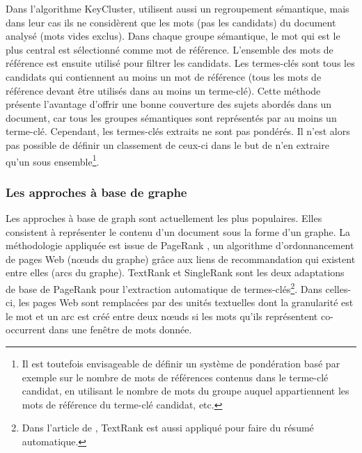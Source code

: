         Dans l'algorithme KeyCluster,   utilisent
        aussi un regroupement sémantique, mais dans leur cas ils ne
        considèrent que les mots (pas les candidats) du document analysé (mots
        vides exclus). Dans chaque groupe sémantique, le mot qui est le plus
        central est sélectionné comme mot de référence. L'ensemble des mots de
        référence est ensuite utilisé pour filtrer les candidats. Les
        termes-clés sont tous les candidats qui contiennent au moins un mot de
        référence (tous les mots de référence devant être utilisés dans au
        moins un terme-clé). Cette méthode présente l'avantage d'offrir une
        bonne couverture des sujets abordés dans un document, car tous les
        groupes sémantiques sont représentés par au moins un terme-clé.
        Cependant, les termes-clés extraits ne sont pas pondérés. Il n'est
        alors pas possible de définir un classement de ceux-ci dans le but de
        n'en extraire qu'un sous ensemble\footnote{Il est toutefois
        envisageable de définir un système de pondération basé par exemple sur
        le nombre de mots de références contenus dans le terme-clé candidat,
        en  utilisant le nombre de mots du groupe auquel appartiennent les
        mots de référence du terme-clé candidat, etc.}.

      \subsubsection{Les approches à base de graphe}
      \label{subsubsec:main-state_of_the_art-automatic_keyphrase_extraction-unsupervised_keyphrase_extraction-graph_based_approaches}
        Les approches à base de graph sont actuellement les plus populaires. Elles consistent à représenter
        le contenu d'un document sous la forme d'un graphe. La méthodologie
        appliquée est issue de PageRank \cite{brin1998pagerank}, un
        algorithme d'ordonnancement de pages Web (n\oe{}uds du graphe) grâce
        aux liens de recommandation qui existent entre elles (arcs du graphe).
        TextRank \cite{mihalcea2004textrank} et SingleRank
        \cite{wan2008expandrank} sont les deux adaptations de base de
        PageRank pour l'extraction automatique de termes-clés\footnote{Dans
        l'article de , TextRank est aussi appliqué
        pour faire du résumé automatique.}. Dans celles-ci, les pages Web sont
        remplacées par des unités textuelles dont la granularité est le mot et
        un arc est créé entre deux n\oe{}uds si les mots qu'ils représentent
        co-occurrent dans une fenêtre de mots donnée.
      
